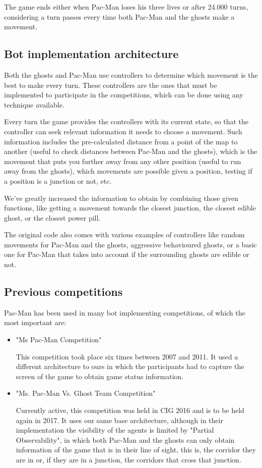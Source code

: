 \documentclass{llncs}
\newcommand{\paco}{Pac-Man }
\begin{document}
The game ends either when \paco loses his three lives or after 24.000 turns, considering a turn passes every time both \paco and the ghosts make a movement.

\subsection{Bot implementation architecture}

Both the ghosts and \paco use controllers to determine which movement is the best to make every turn. These controllers are the ones that must be implemented to participate in the competitions, which can be done using any technique available.

Every turn the game provides the controllers with its current state, so that the controller can seek relevant information it needs to choose a movement. Such information includes the pre-calculated distance from a point of the map to another (useful to check distances between \paco and the ghosts), which is the movement that puts you further away from any other position (useful to run away from the ghosts), which movements are possible given a position, testing if a position is a junction or not, etc. 

We've greatly increased the information to obtain by combining those given functions, like getting a movement towards the closest junction, the closest edible ghost, or the closest power pill.

The original code also comes with various examples of controllers like random movements for \paco and the ghosts, aggressive behavioured ghosts, or a basic one for \paco that takes into account if the surrounding ghosts are edible or not.

\subsection{Previous competitions}

\paco has been used in many bot implementing competitions, of which the most important are:

\begin{itemize}
\setlength{\itemindent}{-.3cm}
\item "Ms Pac-Man Competition"\cite{mspacmancompetitionwebsite}

This competition took place six times between 2007 and 2011. It used a different architecture to ours in which the participants had to capture the screen of the game to obtain game status information. 
\item "Ms. Pac-Man Vs. Ghost Team Competition"\cite{pacmanvsghostsaiwebsite}

Currently active, this competition was held in CIG 2016\cite{pmvsghostspaper2016} and is to be held again in 2017. It uses our same base architecture, although in their implementation the visibility of the agents is limited by "Partial Observability", in which both \paco and the ghosts can only obtain information of the game that is in their line of sight, this is, the corridor they are in or, if they are in a junction, the corridors that cross that junction.
\end{itemize}
\end{document}
